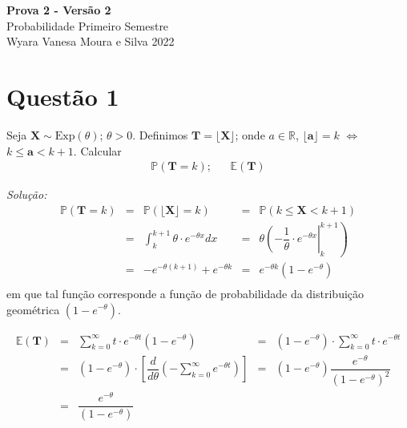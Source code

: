 \documentclass[a4paper, 11pt]{article}
\begin{document}
\noindent
{\Large\textbf{Prova 2 - Versão 2} \hfill \\
Probabilidade \hfill Primeiro Semestre\\
Wyara Vanesa Moura e Silva \hfill 2022\\}

\section*{Questão 1} Seja $\mathbf{X} \sim \mbox{Exp}(\theta)$; $\theta >0$. Definimos $\mathbf{T} = \lfloor \mathbf{X} \rfloor$; onde $a\in \mathds{R}$, $\lfloor \mathbf{a} \rfloor = k$ $\Leftrightarrow$ $k\leq\mathbf{a}<k+1$. Calcular  
\begin{equation*}
\begin{array}{lclll}
\mathds{P}(\mathbf{T} = k) ; &  & \mathds{E}(\mathbf{T})
\end{array}
\end{equation*}

\noindent
\textit{Solução:} \\
\begin{equation*}
\begin{array}{lclll}
\mathds{P}(\mathbf{T} = k) & = & \mathds{P}(\lfloor \mathbf{X} \rfloor = k) & = & \mathds{P}(k\leq\mathbf{X}<k+1) \\

& = &  \displaystyle\int_{k}^{k+1} \theta \cdot e^{-\theta x} dx & = & \left. \theta \left( -\dfrac{1}{\theta} \cdot e^{-\theta x} \right\vert_{k}^{k+1} \right) \\

& = & - e^{-\theta (k+1)} + e^{-\theta k} & = & e^{-\theta k}( 1- e^{-\theta} )\\

\end{array}
\end{equation*}
\noindent
em que tal função corresponde a função de probabilidade da distribuição geométrica $(1-e^{-\theta})$.

\begin{equation*}
\begin{array}{lclll}
\mathds{E}(\mathbf{T}) & = & \displaystyle\sum_{k=0}^{\infty} t \cdot e^{-\theta t}(1-e^{-\theta}) & = & (1-e^{-\theta}) \cdot \displaystyle\sum_{k=0}^{\infty} t \cdot e^{-\theta t} \\[10pt] 

& = & (1-e^{-\theta}) \cdot \left[ \dfrac{d}{d\theta} \left(-\displaystyle\sum_{k=0}^{\infty} e^{-\theta t} \right)\right] & = & (1-e^{-\theta}) \dfrac{e^{-\theta}}{(1-e^{-\theta})^{2}} \\[10pt] 

& = & \dfrac{e^{-\theta}}{(1-e^{-\theta})} 

\end{array}
\end{equation*}
\end{document}
